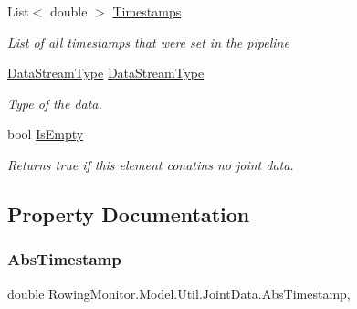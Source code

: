\begin{DoxyCompactItemize}
List$<$ double $>$ \hyperlink{struct_rowing_monitor_1_1_model_1_1_util_1_1_joint_data_a98bf571ea92c7f9b8e197062f17ddc27}{Timestamps}
\begin{DoxyCompactList}\small\item\em List of all timestamps that were set in the pipeline \end{DoxyCompactList}\item 
\hyperlink{namespace_rowing_monitor_1_1_model_1_1_util_a01e1a06061533b246feb7421c9d0107f}{Data\+Stream\+Type} \hyperlink{struct_rowing_monitor_1_1_model_1_1_util_1_1_joint_data_a8ed0022c598484f0b418ad30b50bbfb6}{Data\+Stream\+Type}
\begin{DoxyCompactList}\small\item\em Type of the data. \end{DoxyCompactList}\item 
bool \hyperlink{struct_rowing_monitor_1_1_model_1_1_util_1_1_joint_data_a1e86bf9206df62d0fb4b77c8017ccf8a}{Is\+Empty}
\begin{DoxyCompactList}\small\item\em Returns true if this element conatins no joint data. \end{DoxyCompactList}\end{DoxyCompactItemize}


\subsection{Property Documentation}
\mbox{\label{struct_rowing_monitor_1_1_model_1_1_util_1_1_joint_data_a2c951ee40b3e49be73b92cf39c5aa9ab}} 
\subsubsection{\texorpdfstring{Abs\+Timestamp}{AbsTimestamp}}
{\footnotesize\ttfamily double Rowing\+Monitor.\+Model.\+Util.\+Joint\+Data.\+Abs\+Timestamp\hspace{0.3cm}{\ttfamily [get]}, {\ttfamily [set]}}



